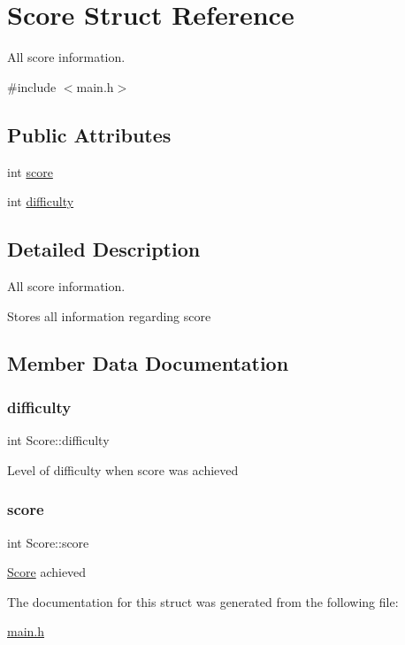 \hypertarget{struct_score}{}\section{Score Struct Reference}
\label{struct_score}


All score information.  




{\ttfamily \#include $<$main.\+h$>$}

\subsection*{Public Attributes}
\begin{DoxyCompactItemize}
\item 
int \hyperlink{struct_score_a331b0927105c83ba760954eff6cf9fe9}{score}
\item 
int \hyperlink{struct_score_af2c37b8548a1fcad347bc9a2afb121e1}{difficulty}
\end{DoxyCompactItemize}


\subsection{Detailed Description}
All score information. 

Stores all information regarding score 

\subsection{Member Data Documentation}
\mbox{\label{struct_score_af2c37b8548a1fcad347bc9a2afb121e1}} 
\subsubsection{\texorpdfstring{difficulty}{difficulty}}
{\footnotesize\ttfamily int Score\+::difficulty}

Level of difficulty when score was achieved \mbox{\label{struct_score_a331b0927105c83ba760954eff6cf9fe9}} 
\subsubsection{\texorpdfstring{score}{score}}
{\footnotesize\ttfamily int Score\+::score}

\hyperlink{struct_score}{Score} achieved 

The documentation for this struct was generated from the following file\+:\begin{DoxyCompactItemize}
\item 
\hyperlink{main_8h}{main.\+h}\end{DoxyCompactItemize}
